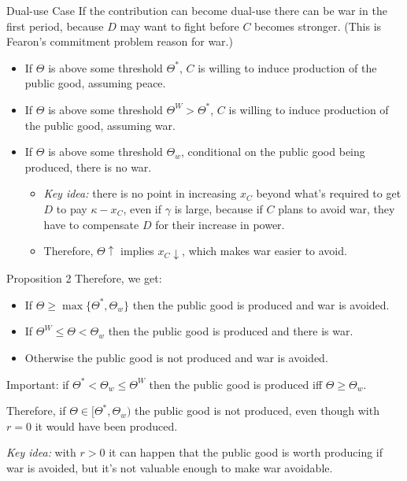 \documentclass[ignorenonframetext,c,12pt]{beamer}
\let\leq=\leqslant %
\let\geq=\geqslant %
\begin{document}
\begin{frame}{Dual-use Case}
  If the contribution can become dual-use there can be war in the first period, because $D$ may want to fight before $C$ becomes stronger. (This is Fearon's commitment problem reason for war.)

  \begin{itemize}
    \item If $\Theta$ is above some threshold $\Theta^*$, $C$ is willing to induce production of the public good, assuming peace.
    \item If $\Theta$ is above some threshold $\Theta^W > \Theta^*$, $C$ is willing to induce production of the public good, assuming war.
    \item If $\Theta$ is above some threshold $\Theta_w$, conditional on the public good being produced, there is no war.
    \begin{itemize}
      \item \textit{Key idea:} there is no point in increasing $x_C$ beyond what's required to get $D$ to pay $\kappa - x_C$, even if $\gamma$ is large, because if $C$ plans to avoid war, they have to compensate $D$ for their increase in power.
      \item Therefore, $\Theta\uparrow$ implies $x_C\downarrow$, which makes war easier to avoid.
    \end{itemize}
  \end{itemize}
\end{frame}

\begin{frame}{Proposition 2}
  Therefore, we get:
  \begin{itemize}
    \item If $\Theta \geq \max\{\Theta^*, \Theta_w\}$ then the public good is produced and war is avoided.
    \item If $\Theta^W \leq \Theta < \Theta_w$ then the public good is produced and there is war.
    \item Otherwise the public good is not produced and war is avoided.
  \end{itemize}

  Important: if $\Theta^* < \Theta_w \leq \Theta^W$ then the public good is produced iff $\Theta \geq \Theta_w$.

  Therefore, if $\Theta \in [\Theta^*, \Theta_w)$ the public good is not produced, even though with $r = 0$ it would have been produced.

  \textit{Key idea:} with $r > 0$ it can happen that the public good is worth producing if war is avoided, but it's not valuable enough to make war avoidable.
\end{frame}
\end{document}
